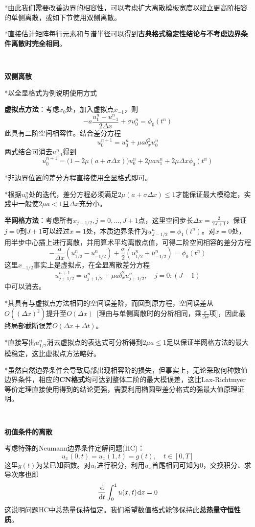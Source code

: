 \documentclass[a4paper,UTF8,fontset=windows]{ctexart}
\newcommand*{\dr}{\hspace{0.07em}\mathrm{d}}
\begin{document}
*由此我们需要改善边界的相容性，可以考虑扩大离散模板宽度以建立更高阶相容的单侧离散，或如下节使用双侧离散。

*直接估计矩阵每行元素和与谱半径可以得到\textbf{古典格式稳定性结论与不考虑边界条件离散时完全相同}。

\

\textbf{双侧离散}

*以全显格式为例说明使用方式

\textbf{虚拟点方法}：考虑$x_0$处，加入虚拟点$x_{-1}$，则
$$-a\frac{u_1^n-u_{-1}^n}{2\Delta x}+\sigma u_0^n=\phi_0(t^n)$$
此具有二阶空间相容性。结合差分方程
$$u_0^{n+1}=u_0^n+\mu a\delta_x^2u_0^n$$
两式结合可消去$u_{-1}^n$得到
$$u_0^{n+1}=\big(1-2\mu(a+\sigma\Delta x)\big)u_0^n+2\mu au_1^n+2\mu\Delta x\phi_0(t^n)$$

*非边界位置的差分方程直接使用全显格式即可。

*根据$u_0^n$处的迭代，差分方程必须满足$2\mu(a+\sigma \Delta x)\le1$才能保证最大模稳定，实践中一般使$2\mu a<1$且$\Delta x$充分小。

\textbf{半网格方法}：考虑所有$x_{j-1/2},j=0,\dots,J+1$点，这里空间步长$\Delta x=\frac{2}{2J+1}$，保证$j=0$到$J+1$可以经过$x=1$处，本质边界条件为$u_{J-1/2}^n=\phi_1(t^n)$。对$x=0$处，用半步中心插上进行离散，并用算术平均离散点值，可得二阶空间相容的差分方程
$$-\frac{a}{\Delta x}(u_{1/2}^n-u_{-1/2}^n)+\frac{\sigma}{2}(u_{1/2}^n+u_{-1/2}^n)=\phi_0(t^n)$$
这里$x_{-1/2}$事实上是虚拟点，在全显离散差分方程
$$u_{j+1/2}^{n+1}=u_{j+1/2}^n+\mu a\delta_x^2u_{j+1/2}^n,\quad j=0:(J-1)$$
中可以消去。

*其具有与虚拟点方法相同的空间误差阶，而回到原方程，空间误差从$O((\Delta x)^2)$提升至$O(\Delta x)$\ [理由与单侧离散时的分析相同，乘$\frac{\tilde\sigma}{\Delta x}$项]，因此最终局部截断误差$O(\Delta x+\Delta t)$。

*直接写出$u_{1/2}^n$消去虚拟点的表达式可分析得到$2\mu a\le 1$足以保证半网格方法的最大模稳定，这比虚拟点方法略好。

*虽然自然边界条件会导致局部出现相容阶的损失，但事实上，无论采取何种数值边界条件，相应的\textbf{CN格式}均可达到整体二阶的最大模误差，这比Lax-Richtmyer等价定理直接使用得到的结论更强，需要利用椭圆型差分格式的强最大值原理证明。

\

\textbf{初值条件的离散}

考虑特殊的Neumann边界条件定解问题(HC)：
$$u_x(0,t)=u_x(1,t)=g(t),\quad t\in[0,T]$$
这里$g(t)$为某已知函数。对$u_t$进行积分，利用$u_x$首尾相同可知为0，交换积分、求导次序也即
$$\frac{\dr}{\dr t}\int_0^1u(x,t)\dr x=0$$
这说明问题HC中总热量保持恒定。我们希望数值格式能够保持此\textbf{总热量守恒性质}。
\end{document}
